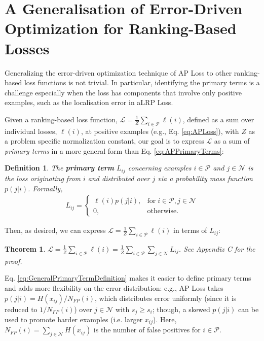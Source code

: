 \documentclass{article}
\newtheorem{theorem}{Theorem}
\newtheorem{definition}{Definition}
\begin{document}
%
 \section{A Generalisation of Error-Driven Optimization for Ranking-Based Losses}
\label{sec:generalization}

Generalizing the error-driven optimization technique of AP Loss \cite{APLoss} to other ranking-based loss functions is not trivial. In particular, identifying the primary terms is a challenge especially when the loss has components that involve only  positive examples, such as the localisation error in aLRP Loss. 

Given a ranking-based loss function, $\mathcal{L}=\frac{1}{Z}\sum_{i \in \mathcal{P}} \ell(i)$, defined as a sum over individual losses, $\ell(i)$, at positive examples (e.g., Eq. \eqref{eq:APLoss}), with $Z$ as a problem specific normalization constant, our goal is to express $\mathcal{L}$ as a sum of \textit{primary terms} in a more general form than Eq. \eqref{eq:APPrimaryTerms}: 

\begin{definition} The \textbf{primary term} $L_{ij}$ concerning examples $i \in \mathcal{P}$ and $j \in \mathcal{N}$  is the loss originating from $i$ and distributed over $j$ via a probability mass function $p (j | i)$. Formally, 
\begin{align}
    \label{eq:GeneralPrimaryTermDefinition}
    L_{ij} = \begin{cases} \ell (i) p(j|i), & \mathrm{for}\;i \in \mathcal{P}, j \in \mathcal{N} \\
    0, & \mathrm{otherwise}.
    \end{cases}
\end{align}
\end{definition}
Then, as desired, we can express $\mathcal{L}=\frac{1}{Z}\sum_{i \in \mathcal{P}} \ell(i)$ in terms of $L_{ij}$:
\begin{theorem}
\label{theorem:PrimaryTerms}
$\mathcal{L}= \frac{1}{Z}\sum \limits_{i \in \mathcal{P} } \ell(i) =
\frac{1}{Z}\sum \limits_{i \in \mathcal{P} }\sum \limits_{j \in \mathcal{N} }  L_{ij}$. See Appendix C for the proof.
\end{theorem}{}
Eq. \eqref{eq:GeneralPrimaryTermDefinition} makes it easier to define primary terms and adds more flexibility on the error distribution: e.g., AP Loss takes $p(j|i) = H(x_{ij})/N_{FP}(i)$, which distributes error uniformly (since it is reduced to $1/N_{FP}(i)$) over $j \in \mathcal{N}$ with $s_j \geq s_i$; though, a skewed $p(j|i)$  can be used to promote harder examples (i.e. larger $x_{ij}$). Here, $N_{FP}(i) = \sum_{j \in \mathcal{N}} H(x_{ij})$ is the number of false positives for $i \in \mathcal{P}$.
\end{document}
